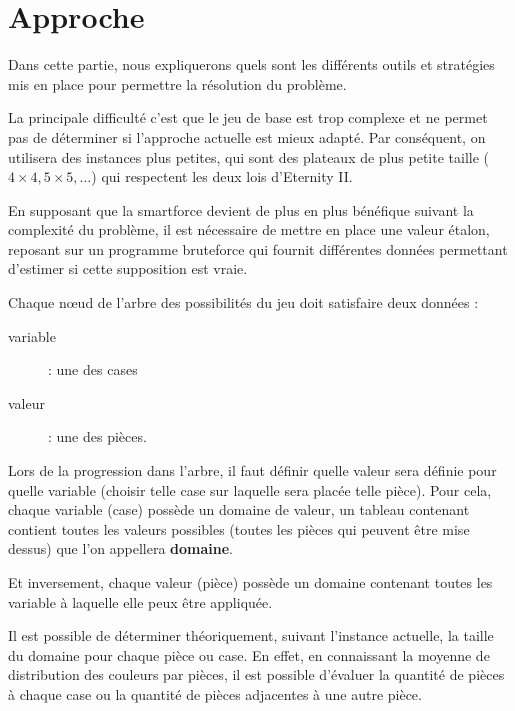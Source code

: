 
\section{Approche}

	Dans cette partie, nous expliquerons quels sont les différents outils et stratégies mis en place pour permettre la résolution du problème.
	
	La principale difficulté c'est que le jeu de base est trop complexe et ne permet pas de déterminer si l'approche actuelle est mieux adapté. Par conséquent, on utilisera des instances plus petites, qui sont des plateaux de plus petite taille ($4\times 4, 5\times 5, \dots$) qui respectent les deux lois d'Eternity II. 
	
	En supposant que la smartforce devient de plus en plus bénéfique suivant la complexité du problème, il est nécessaire de mettre en place une valeur étalon, reposant sur un programme bruteforce qui fournit différentes données permettant d'estimer si cette supposition est vraie.
	
	Chaque n\oe ud de l'arbre des possibilités du jeu doit satisfaire deux données :
	
	\begin{description}
		\item[variable] : une des cases
		\item[valeur] : une des pièces.
	\end{description}
	
	Lors de la progression dans l'arbre, il faut définir quelle valeur sera définie pour quelle variable (choisir telle case sur laquelle sera placée telle pièce). Pour cela, chaque variable (case) possède un domaine de valeur, un tableau contenant contient toutes les valeurs possibles (toutes les pièces qui peuvent être mise dessus) que l'on appellera \textbf{domaine}.
	
	Et inversement, chaque valeur (pièce) possède un domaine contenant toutes les variable à laquelle elle peux être appliquée.
	
	Il est possible de déterminer théoriquement, suivant l'instance actuelle, la taille du domaine pour chaque pièce ou case. En effet, en connaissant la moyenne de distribution des couleurs par pièces, il est possible d'évaluer la quantité de pièces à chaque case ou la quantité de pièces adjacentes à une autre pièce.
	
